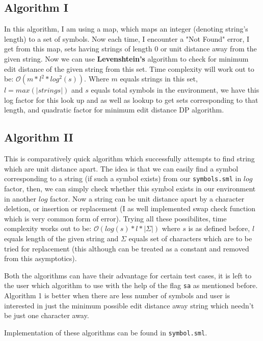 \subsection{Algorithm I}

In this algorithm, I am using a map, which maps an integer (denoting string's length) to a set of symbols. Now each time, I encounter a "Not Found" error, I get from this map, sets having strings of length 0 or unit distance away from the given string. Now we can use \textbf{Levenshtein's} algorithm to check for minimum edit distance of the given string from this set. Time complexity will work out to be: $\mathcal{O}(m * l^2 * log^2(s))$. Where $m$ equals strings in this set, $l = max(|strings|)$ and $s$ equals total symbols in the environment, we have this log factor for this look up and as well as lookup to get sets corresponding to that length, and quadratic factor for minimum edit distance DP algorithm.

\subsection{Algorithm II}

This is comparatively quick algorithm which successfully attempts to find string which are unit distance apart. The idea is that we can easily find a symbol corresponding to a string (if such a symbol exists) from our \texttt{symbols.sml} in $log$ factor, then, we can simply check whether this symbol exists in our environment in another $log$ factor. Now a string can be unit distance apart by a character deletion, or insertion or replacement (I as well implemented swap check function which is very common form of error). Trying all these possibilites, time complexity works out to be: $\mathcal{O}(log(s) * l * |\Sigma|)$ where $s$ is as defined before, $l$ equals length of the given string and $\Sigma$ equals set of characters which are to be tried for replacement (this although can be treated as a constant and removed from this asymptotics).

Both the algorithms can have their advantage for certain test cases, it is left to the user which algorithm to use with the help of the flag \texttt{sa} as mentioned before. Algorithm 1 is better when there are less number of symbols and user is interested in just the minimum possible edit distance away string which needn't be just one character away.

Implementation of these algorithms can be found in \texttt{symbol.sml}.

